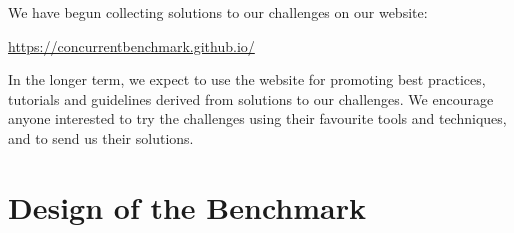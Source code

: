 \documentclass[runningheads]{llncs}
\begin{document}
We have begun collecting solutions to our challenges on our website:
%
\begin{center}
  \url{https://concurrentbenchmark.github.io/}
\end{center}
%
In the longer term, we expect to use the website for promoting best practices, tutorials and guidelines derived from solutions to our challenges.
We encourage anyone interested to try the challenges using their favourite tools and techniques, and to send us their solutions.


\section{Design of the Benchmark}\label{sec:design-discussion}
\end{document}

